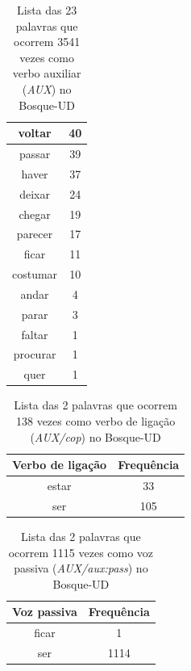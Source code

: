 \documentclass[output=paper,colorlinks,citecolor=brown]{langscibook}
\begin{document}
\begin{table}[]
{\begin{tabular}{|c|c|}
				voltar & 40\\\hline
				passar & 39\\\hline
				haver & 37\\\hline
				deixar & 24\\\hline
				chegar & 19\\\hline
				parecer & 17\\\hline
				ficar & 11\\\hline
				costumar & 10\\\hline
				andar & 4\\\hline
				parar & 3\\\hline
				faltar & 1\\\hline
				procurar & 1\\\hline
				quer & 1\\\hline
			\end{tabular}
		}
		\caption{Lista das 23 palavras que ocorrem 3541 vezes como verbo auxiliar (\emph{AUX}) no Bosque-UD}
		\label{tab:aux}
	\end{table}
	
	\begin{table}[]
		\centering
		\begin{tabular}{|c|c|}
			\hline
			\textbf{Verbo de ligação} & \textbf{Frequência} \\\hline
			estar & 33\\\hline
			ser & 105\\\hline
		\end{tabular}
		\caption{Lista das 2 palavras que ocorrem 138 vezes como verbo de ligação (\emph{AUX/cop}) no Bosque-UD}
		\label{tab:verbosdeligacao}
	\end{table}

	\begin{table}[]
		\centering
		\begin{tabular}{|c|c|}
			\hline
			\textbf{Voz passiva} & \textbf{Frequência} \\\hline
			ficar & 1\\\hline
			ser & 1114\\\hline
		\end{tabular}
		\caption{Lista das 2 palavras que ocorrem 1115 vezes como voz passiva (\emph{AUX/aux:pass}) no Bosque-UD}
		\label{tab:vozpassiva}
	\end{table}
\end{document}
